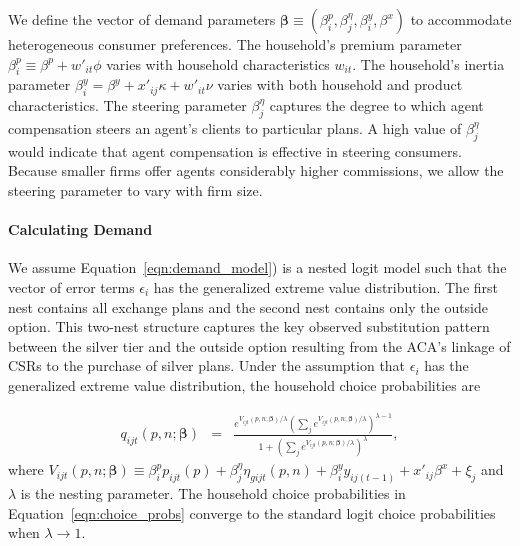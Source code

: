 \documentclass[12pt]{article}
\begin{document}
We define the vector of demand parameters $\boldsymbol{\beta} \equiv (\beta_i^p,\beta_j^{\eta},\beta_i^y,\beta^x)$ to accommodate heterogeneous consumer preferences.  The household's premium parameter $\beta_{i}^p \equiv \beta^p + w'_{it} \phi$ varies with household characteristics $w_{it}$.  The household's inertia parameter $\beta_i^y = \beta^y +  x'_{ij} \kappa + w'_{it} \nu$ varies with both household and product characteristics. The steering parameter $\beta_j^{\eta}$ captures the degree to which agent compensation steers  an agent's clients to particular plans.  A high value of $\beta_j^{\eta}$ would indicate that agent compensation is effective in steering consumers.   Because smaller firms offer agents considerably higher commissions, we allow the steering parameter to vary with firm size.


\paragraph{Calculating Demand}
We assume Equation~\eqref{eqn:demand_model}) is a nested logit model such that the vector of error terms $\epsilon_i$ has the generalized extreme value distribution.  The first nest contains all exchange plans and the second nest contains only the outside option.  This two-nest structure captures the key observed substitution pattern between the silver tier and the outside option resulting from the ACA's linkage of CSRs to the purchase of silver plans. Under the assumption that $\epsilon_i$ has the generalized extreme value distribution, the household choice probabilities are 

\vspace{-0.4in}		
\begin{eqnarray}
\label{eqn:choice_probs}
	q_{ijt}(\textit{p},\textit{n};\boldsymbol{\beta}) &=&  \frac{e^{V_{ijt}(\textit{p},\textit{n};\boldsymbol{\beta})/\lambda}\left(\sum_{j } e^{V_{ijt}(\textit{p},\textit{n};\boldsymbol{\beta})/\lambda}\right)^{\lambda-1}}{1 + \left(\sum_{j} e^{V_{ijt}(\textit{p},\textit{n};\boldsymbol{\beta})/\lambda}\right)^{\lambda}},
\end{eqnarray}
\noindent where $V_{ijt}(\textit{p},\textit{n};\boldsymbol{\beta}) \equiv \beta_{i}^p p_{ijt}(\textit{p}) + \beta_j^{\eta} \eta_{gijt}(\textit{p},\textit{n})   + \beta_i^y y_{ij(t-1)} + x'_{ij}\beta^x + \xi_{j}$ and $\lambda$ is the nesting parameter. The household choice probabilities in Equation~\eqref{eqn:choice_probs} converge to the standard logit choice probabilities when $\lambda \rightarrow 1$.
\end{document}
